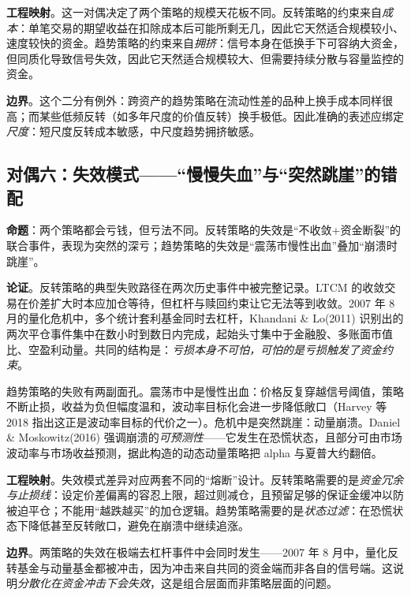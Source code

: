 \textbf{工程映射}。这一对偶决定了两个策略的规模天花板不同。反转策略的约束来自\emph{成本}：单笔交易的期望收益在扣除成本后可能所剩无几，因此它天然适合规模较小、速度较快的资金。趋势策略的约束来自\emph{拥挤}：信号本身在低换手下可容纳大资金，但同质化导致信号失效，因此它天然适合规模较大、但需要持续分散与容量监控的资金。

\textbf{边界}。这个二分有例外：跨资产的趋势策略在流动性差的品种上换手成本同样很高；而某些低频反转（如多年尺度的价值反转）换手极低。因此准确的表述应绑定\emph{尺度}：短尺度反转成本敏感，中尺度趋势拥挤敏感。

\subsection{对偶六：失效模式——“慢慢失血”与“突然跳崖”的错配}

\textbf{命题}：两个策略都会亏钱，但亏法不同。反转策略的失效是“不收敛+资金断裂”的联合事件，表现为突然的深亏；趋势策略的失效是“震荡市慢性出血”叠加“崩溃时跳崖”。

\textbf{论证}。反转策略的典型失败路径在两次历史事件中被完整记录。LTCM 的收敛交易在价差扩大时本应加仓等待，但杠杆与赎回约束让它无法等到收敛\cite{lowenstein2000,jorion2000}。2007 年 8 月的量化危机中，多个统计套利基金同时去杠杆，Khandani \& Lo(2011) 识别出的两次平仓事件集中在数小时到数日内完成，起始头寸集中于金融股、多账面市值比、空盈利动量\cite{khandanilo2011}。共同的结构是：\emph{亏损本身不可怕，可怕的是亏损触发了资金约束}。

趋势策略的失败有两副面孔。震荡市中是慢性出血：价格反复穿越信号阈值，策略不断止损，收益为负但幅度温和，波动率目标化会进一步降低敞口（Harvey 等 2018 指出这正是波动率目标的代价之一\cite{harvey2018}）。危机中是突然跳崖：动量崩溃。Daniel \& Moskowitz(2016) 强调崩溃的\emph{可预测性}——它发生在恐慌状态，且部分可由市场波动率与市场收益预测，据此构造的动态动量策略把 alpha 与夏普大约翻倍\cite{danielmoskowitz2016}。

\textbf{工程映射}。失效模式差异对应两套不同的“熔断”设计。反转策略需要的是\emph{资金冗余与止损线}：设定价差偏离的容忍上限，超过则减仓，且预留足够的保证金缓冲以防被迫平仓；不能用“越跌越买”的加仓逻辑。趋势策略需要的是\emph{状态过滤}：在恐慌状态下降低甚至反转敞口，避免在崩溃中继续追涨。

\textbf{边界}。两策略的失效在极端去杠杆事件中会同时发生——2007 年 8 月中，量化反转基金与动量基金都被冲击，因为冲击来自共同的资金端而非各自的信号端\cite{khandanilo2011,brunnermeier2009}。这说明\emph{分散化在资金冲击下会失效}，这是组合层面而非策略层面的问题。

